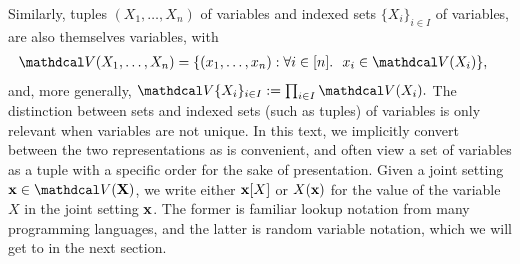 Similarly, tuples $(X_1, \ldots, X_n)$ of variables and indexed sets $\{X_i\}_{i \in I}$ of variables, are also themselves variables,
with
\begin{align*}
    \V(X_1, \ldots, X_n) &= \{ (x_1, \ldots, x_n) : \forall i \in [n].~~ x_i \in \V(X_i) \},
\end{align*}
and, more generally,
$
    \V\{ X_i \}_{i \in I} := \prod_{i \in I} \V(X_i).
$
The distinction between sets and indexed sets (such as tuples) of variables is only relevant when variables are not unique.
In this text, we implicitly convert between the two representations as is convenient, and often view a set of variables as a tuple with a specific order for the sake of presentation.
%
Given a joint setting $\mat x \in \V(\mat X)$, we write either $\mathbf x[X]$ or  $X(\mathbf x)$ for the value of the variable $X$ in the joint setting $\mathbf x$. The former is familiar lookup notation from many programming languages, and the latter is random variable notation, which we will get to in the next section.


